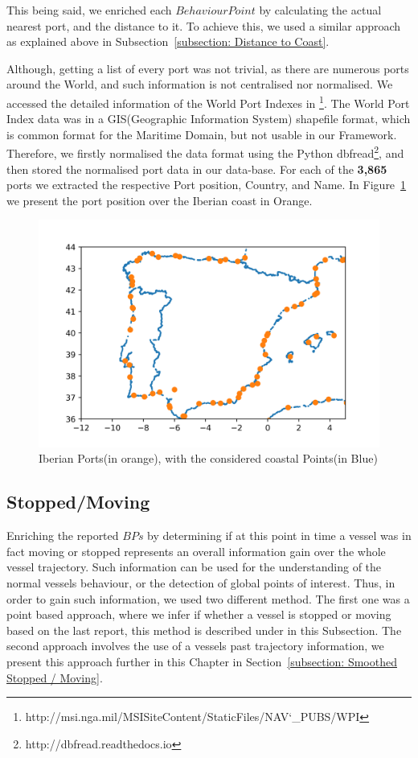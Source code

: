 This being said, we enriched each $Behaviour Point$ by calculating the actual nearest port, and the distance to it. To achieve this, we used a similar approach as explained above in Subsection~\ref{subsection: Distance to Coast}.

Although, getting a list of every port was not trivial, as there are numerous ports around the World, and such information is not 
centralised nor normalised.
We accessed the detailed information of the World Port Indexes in \footnote{http://msi.nga.mil/MSISiteContent/StaticFiles/NAV\char`_PUBS/WPI}. The World Port Index data was in a GIS(Geographic Information System) shapefile format, which is common format for the Maritime Domain, but not usable in our Framework. Therefore, we firstly normalised the data format using the Python dbfread\footnote{http://dbfread.readthedocs.io}, and then stored the normalised port data in our data-base. 
For each of the \textbf{3,865} ports we extracted the respective Port position, Country, and Name. 
In Figure~\ref{fig: 4 Ports} we present the port position over the Iberian coast in Orange.

\begin{figure}[H]
\centering
\includegraphics[scale = .9]{figures/Ch4/ports.png}
\caption{Iberian Ports(in orange), with the considered coastal Points(in Blue)}
\label{fig: 4 Ports}
\end{figure}

\subsection{Stopped/Moving}
\label{subsection: Stopped/Moving}
Enriching the reported $BPs$ by determining if at this point in time a vessel was in fact moving or stopped represents an overall information gain over the whole vessel trajectory. Such information can be used for the understanding of the normal vessels behaviour, or the detection of global points of interest.
Thus, in order to gain such information, we used two different method. The first one was a point based approach, where we infer if whether a vessel is stopped or moving based on the last report, this method is described under in this Subsection. The second approach involves the use of a vessels past trajectory information, we present this approach further in this Chapter in Section~\ref{subsection: Smoothed Stopped / Moving}.

